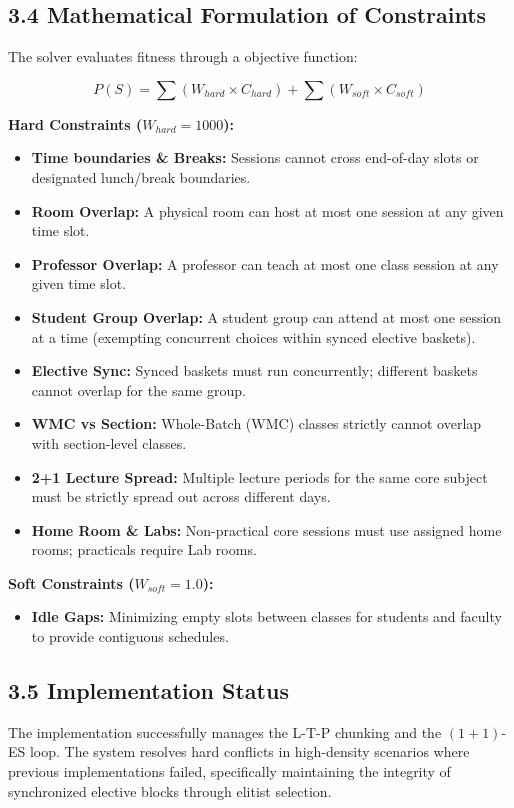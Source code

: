 \documentclass{article}
\begin{document}
\subsection*{3.4 Mathematical Formulation of Constraints}
The solver evaluates fitness through a objective function:

\begin{equation}
P(S) = \sum (W_{hard} \times C_{hard}) + \sum (W_{soft} \times C_{soft})
\end{equation}

\textbf{Hard Constraints ($W_{hard} = 1000$):}
\begin{itemize}
    \item \textbf{Time boundaries \& Breaks:} Sessions cannot cross end-of-day slots or designated lunch/break boundaries.
    \item \textbf{Room Overlap:} A physical room can host at most one session at any given time slot.
    \item \textbf{Professor Overlap:} A professor can teach at most one class session at any given time slot.
    \item \textbf{Student Group Overlap:} A student group can attend at most one session at a time (exempting concurrent choices within synced elective baskets).
    \item \textbf{Elective Sync:} Synced baskets must run concurrently; different baskets cannot overlap for the same group.
    \item \textbf{WMC vs Section:} Whole-Batch (WMC) classes strictly cannot overlap with section-level classes.
    \item \textbf{2+1 Lecture Spread:} Multiple lecture periods for the same core subject must be strictly spread out across different days.
    \item \textbf{Home Room \& Labs:} Non-practical core sessions must use assigned home rooms; practicals require Lab rooms.
\end{itemize}

\textbf{Soft Constraints ($W_{soft} = 1.0$):}
\begin{itemize}
    \item \textbf{Idle Gaps:} Minimizing empty slots between classes for students and faculty to provide contiguous schedules.
\end{itemize}

\subsection*{3.5 Implementation Status}
The implementation successfully manages the L-T-P chunking and the $(1+1)$-ES loop. The system resolves hard conflicts in high-density scenarios where previous implementations failed, specifically maintaining the integrity of synchronized elective blocks through elitist selection.
\end{document}
